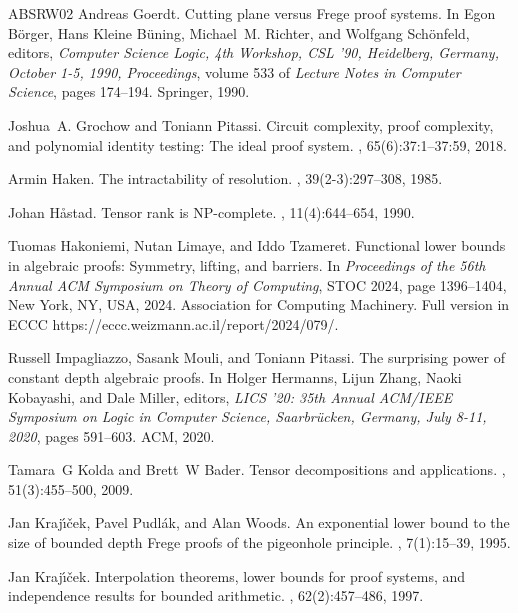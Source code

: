 \documentclass[11pt,letter]{article}
\theoremstyle{remark} %
\begin{document}
{\begin{thebibliography}{ABSRW02}
Andreas Goerdt.
\newblock Cutting plane versus {F}rege proof systems.
\newblock In Egon B{\"{o}}rger, Hans Kleine{ }B{\"{u}}ning, Michael~M. Richter, and Wolfgang Sch{\"{o}}nfeld, editors, {\em Computer Science Logic, 4th Workshop, {CSL} '90, Heidelberg, Germany, October 1-5, 1990, Proceedings}, volume 533 of {\em Lecture Notes in Computer Science}, pages 174--194. Springer, 1990.

Joshua~A. Grochow and Toniann Pitassi.
\newblock Circuit complexity, proof complexity, and polynomial identity testing: The ideal proof system.
, 65(6):37:1--37:59, 2018.

Armin Haken.
\newblock The intractability of resolution.
, 39(2-3):297--308, 1985.

Johan H{\aa}stad.
\newblock Tensor rank is {NP}-complete.
, 11(4):644--654, 1990.

Tuomas Hakoniemi, Nutan Limaye, and Iddo Tzameret.
\newblock Functional lower bounds in algebraic proofs: Symmetry, lifting, and barriers.
\newblock In {\em Proceedings of the 56th Annual ACM Symposium on Theory of Computing}, STOC 2024, page 1396–1404, New York, NY, USA, 2024. Association for Computing Machinery.
\newblock Full version in ECCC https://eccc.weizmann.ac.il/report/2024/079/.

Russell Impagliazzo, Sasank Mouli, and Toniann Pitassi.
\newblock The surprising power of constant depth algebraic proofs.
\newblock In Holger Hermanns, Lijun Zhang, Naoki Kobayashi, and Dale Miller, editors, {\em {LICS} '20: 35th Annual {ACM/IEEE} Symposium on Logic in Computer Science, Saarbr{\"{u}}cken, Germany, July 8-11, 2020}, pages 591--603. {ACM}, 2020.

Tamara~G Kolda and Brett~W Bader.
\newblock Tensor decompositions and applications.
, 51(3):455--500, 2009.

Jan Kraj{\'{\i}}{\v{c}}ek, Pavel Pudl{\'a}k, and Alan Woods.
\newblock An exponential lower bound to the size of bounded depth {F}rege proofs of the pigeonhole principle.
, 7(1):15--39, 1995.

Jan Kraj{\'{\i}}{\v{c}}ek.
\newblock Interpolation theorems, lower bounds for proof systems, and independence results for bounded arithmetic.
, 62(2):457--486, 1997.


\end{thebibliography}}
\end{document}

